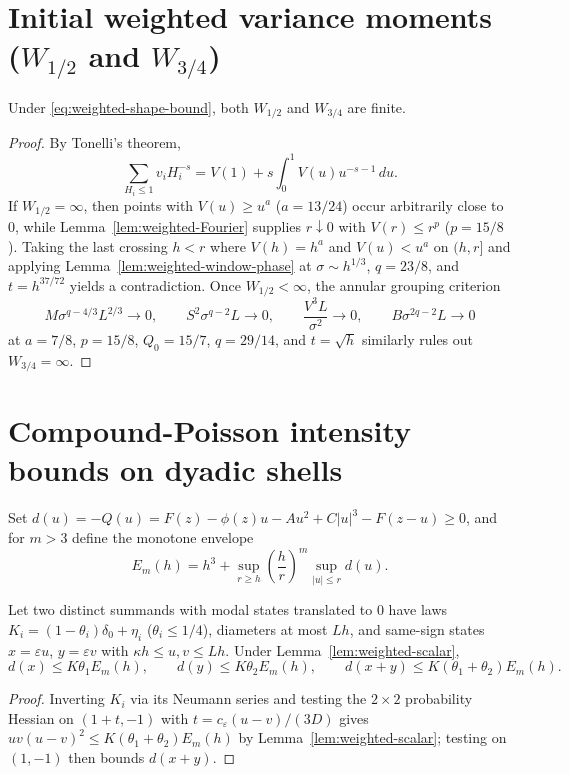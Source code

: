 \section{Initial weighted variance moments ($W_{1/2}$ and $W_{3/4}$)}\label{sec:weighted-first}

\begin{lemma}\label{lem:weighted-subunit}
Under \eqref{eq:weighted-shape-bound}, both $W_{1/2}$ and $W_{3/4}$ are
finite.
\end{lemma}
\begin{proof}
By Tonelli's theorem,
\begin{equation}\label{eq:weighted-Tonelli}
 \sum_{H_i\le1}v_iH_i^{-s}
                 =V(1)+s\int_0^1 V(u)u^{-s-1}\,du.
\end{equation}
If $W_{1/2}=\infty$, then points with $V(u)\ge u^a$ ($a=13/24$) occur
arbitrarily close to $0$, while Lemma~\ref{lem:weighted-Fourier} supplies
$r\downarrow0$ with $V(r)\le r^p$ ($p=15/8$). Taking the last crossing
$h<r$ where $V(h)=h^a$ and $V(u)<u^a$ on $(h,r]$ and applying
Lemma~\ref{lem:weighted-window-phase} at $\sigma\sim h^{1/3}$, $q=23/8$, and
$t=h^{37/72}$ yields a contradiction. Once $W_{1/2}<\infty$, the annular
grouping criterion
\begin{equation}\label{eq:weighted-annular-window}
 M\sigma^{q-4/3}L^{2/3}\to0,\qquad
 S^2\sigma^{q-2}L\to0,\qquad
 \frac{V^3L}{\sigma^2}\to0,\qquad B\sigma^{2q-2}L\to0
\end{equation}
at $a=7/8$, $p=15/8$, $Q_0=15/7$, $q=29/14$, and $t=\sqrt h$ similarly
rules out $W_{3/4}=\infty$.
\end{proof}

\section{Compound-Poisson intensity bounds on dyadic shells}\label{sec:weighted-packets}

Set $d(u)=-Q(u)=F(z)-\phi(z)u-Au^2+C|u|^3-F(z-u)\ge0$, and for $m>3$ define
the monotone envelope
\begin{equation}\label{eq:weighted-envelope}
 E_m(h)=h^3+\sup_{r\ge h}\left(\frac hr\right)^m\sup_{|u|\le r}d(u).
\end{equation}

\begin{lemma}\label{lem:weighted-pair}
Let two distinct summands with modal states translated to $0$ have laws
$K_i=(1-\theta_i)\delta_0+\eta_i$ ($\theta_i\le1/4$), diameters at most $Lh$,
and same-sign states $x=\varepsilon u$, $y=\varepsilon v$ with
$\kappa h\le u,v\le Lh$. Under Lemma~\ref{lem:weighted-scalar},
\[
 d(x)\le K\theta_1E_m(h),\qquad
 d(y)\le K\theta_2E_m(h),\qquad
 d(x+y)\le K(\theta_1+\theta_2)E_m(h).
\]
\end{lemma}
\begin{proof}
Inverting $K_i$ via its Neumann series and testing the $2\times2$ probability
Hessian on $(1+t,-1)$ with $t=c_\varepsilon(u-v)/(3D)$ gives
$uv(u-v)^2\le K(\theta_1+\theta_2)E_m(h)$ by Lemma~\ref{lem:weighted-scalar};
testing on $(1,-1)$ then bounds $d(x+y)$.
\end{proof}

